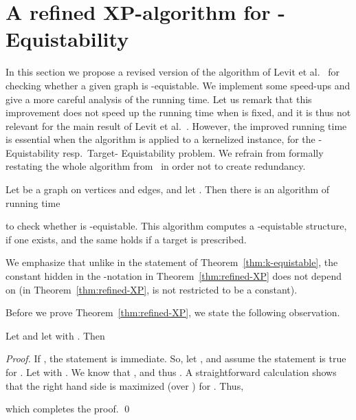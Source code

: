 \documentclass{llncs}
\begin{document}
\section{A refined XP-algorithm for {\sc -Equistability}}\label{sec:XP}

In this section we propose a revised version of the algorithm of Levit et al.~\cite{MR3040147} for checking whether a given graph is -equistable.
We implement some speed-ups and give a more careful analysis of the running time. Let us remark that this improvement does not speed up the running time when  is fixed, and it is thus not relevant for the main result of Levit et al.~\cite{MR3040147}.
However, the improved running time is essential when the algorithm is applied to a kernelized instance, for the
{\sc -Equistability} resp.~{\sc Target- Equistability} problem.
We refrain from formally restating the whole algorithm from~\cite{MR3040147} in order not to create redundancy.

\begin{theorem}\label{thm:refined-XP}
Let  be a graph on  vertices and  edges, and let .
Then there is an algorithm of running time

to check whether  is -equistable.
This algorithm computes a -equistable structure, if one exists, and the same holds if a target  is prescribed.
\end{theorem}

We emphasize that unlike in the statement of Theorem~\ref{thm:k-equistable}, the constant hidden in the -notation
in Theorem~\ref{thm:refined-XP} does not depend on  (in Theorem~\ref{thm:refined-XP},  is not restricted to be a constant).

Before we prove Theorem~\ref{thm:refined-XP}, we state the following observation.

\begin{lemma}\label{lem:technicalbound}
Let  and let  with .
Then 
\end{lemma}

\begin{sloppypar}
\begin{proof}
If , the statement is immediate.
So, let , and assume the statement is true for .
Let  with .
We know that ,
and thus \hbox{} \hbox{}.
A straightforward calculation shows that the right hand side is maximized (over )
for .
Thus,

which completes the proof.
\qed \end{proof}
\end    {sloppypar}
\end{document}
